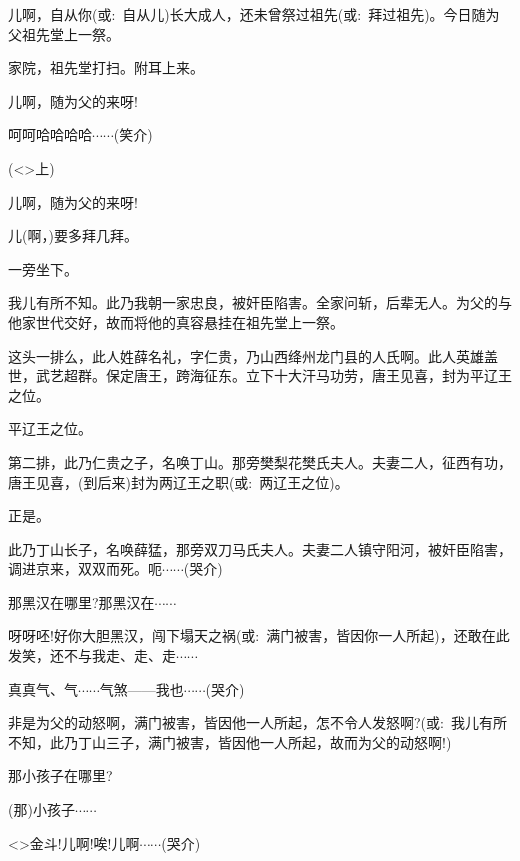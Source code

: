 {

儿啊，自从你({\akai 或}:~自从儿)长大成人，还未曾祭过祖先({\akai 或}:~拜过祖先)。今日随为父祖先堂上一祭。

家院，祖先堂打扫。附耳上来。

儿啊，随为父的来呀!

呵呵哈哈哈哈$\cdots{}\cdots{}$({\hwfs 笑介})

\vspace{5pt}

(\textless{}\!\textgreater{}{\hwfs 上})

儿啊，随为父的来呀!

儿(啊，)要多拜几拜。

一旁坐下。

我儿有所不知。此乃我朝一家忠良，被奸臣陷害。全家问斩，后辈无人。为父的与他家世代交好，故而将他的真容悬挂在祖先堂上一祭。

这头一排么，此人姓薛名礼，字仁贵，乃山西绛州龙门县的人氏啊。此人英雄盖世，武艺超群。保定唐王，跨海征东。立下十大汗马功劳，唐王见喜，封为平辽王之位。

平辽王之位。

第二排，此乃仁贵之子，名唤丁山。那旁樊梨花樊氏夫人。夫妻二人，征西有功，唐王见喜，(到后来)封为两辽王之职({\akai 或}:~两辽王之位)。

正是。

此乃丁山长子，名唤薛猛，那旁双刀马氏夫人。夫妻二人镇守阳河，被奸臣陷害，调进京来，双双而死。呃$\cdots{}\cdots{}$({\hwfs 哭}{\hwfs 介})

那黑汉在哪里?那黑汉在$\cdots{}\cdots{}$

呀呀呸!好你大胆黑汉，闯下塌天之祸({\akai 或}:~满门被害，皆因你一人所起)，还敢在此发笑，还不与我走、走、走$\cdots{}\cdots{}$

真真气、气$\cdots{}\cdots{}$气煞------我也$\cdots{}\cdots{}$({\hwfs 哭}{\hwfs 介})

非是为父的动怒啊，满门被害，皆因他一人所起，怎不令人发怒啊?({\akai 或}:~我儿有所不知，此乃丁山三子，满门被害，皆因他一人所起，故而为父的动怒啊!)

那小孩子在哪里?

(那)小孩子$\cdots{}\cdots{}$

\textless{}\!\textgreater{}金斗!儿啊!唉!儿啊$\cdots{}\cdots{}$({\hwfs 哭介})

}
